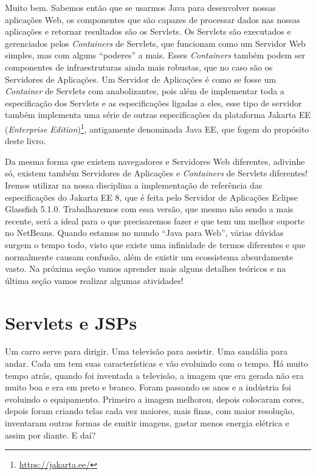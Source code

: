 Muito bem. Sabemos então que se usarmos Java para desenvolver nossas aplicações Web, os componentes que são capazes de processar dados nas nossas aplicações e retornar resultados são os Servlets. Os Servlets são executados e gerenciados pelos \textit{Containers} de Servlets, que funcionam como um Servidor Web simples, mas com alguns ``poderes'' a mais. Esses \textit{Containers} também podem ser componentes de infraestruturas ainda mais robustas, que no caso são os Servidores de Aplicações. Um Servidor de Aplicações é como se fosse um \textit{Container} de Servlets com anabolizantes, pois além de implementar toda a especificação dos Servlets e as especificações ligadas a eles, esse tipo de servidor também implementa uma série de outras especificações da plataforma Jakarta EE (\textit{Enterprise Edition})\footnote{\url{https://jakarta.ee/}}, antigamente denominada Java EE, que fogem do propósito deste livro.

Da mesma forma que existem navegadores e Servidores Web diferentes, adivinhe só, existem também Servidores de Aplicações e \textit{Containers} de Servlets diferentes! Iremos utilizar na nossa disciplina a implementação de referência das especificações do Jakarta EE 8, que é feita pelo Servidor de Aplicações Eclipse Glassfish 5.1.0. Trabalharemos com essa versão, que mesmo não sendo a mais recente, será a ideal para o que precisaremos fazer e que tem um melhor suporte no NetBeans. Quando estamos no mundo ``Java para Web'', várias dúvidas surgem o tempo todo, visto que existe uma infinidade de termos diferentes e que normalmente causam confusão, além de existir um ecossistema absurdamente vasto. Na próxima seção vamos aprender mais alguns detalhes teóricos e na última seção vamos realizar algumas atividades!


\section{Servlets e JSPs}

Um carro serve para dirigir. Uma televisão para assistir. Uma sandália para andar. Cada um tem suas características e vão evoluindo com o tempo. Há muito tempo atrás, quando foi inventada a televisão, a imagem que era gerada não era muito boa e era em preto e branco. Foram passando os anos e a indústria foi evoluindo o equipamento. Primeiro a imagem melhorou, depois colocaram cores, depois foram criando telas cada vez maiores, mais finas, com maior resolução, inventaram outras formas de emitir imagens, gastar menos energia elétrica e assim por diante. E daí?

